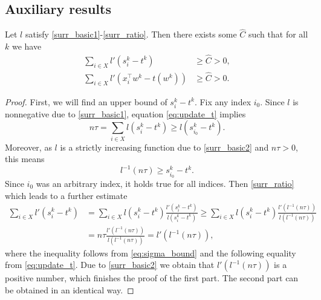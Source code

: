 \subsection{Auxiliary results}\label{app:sgd3}

\begin{lemma}\label{lemma:bound_zero}
  Let $l$ satisfy \ref{surr_basic1}-\ref{surr_ratio}. Then there exists some $\hat C$ such that for all $k$ we have
  \begin{equation*}
    \begin{aligned}
      \sum_{i\in X}l'(s_i^k-t^k) & \ge \hat C > 0, \\
      \sum_{i\in X}l'(x_i^\top w^k-t(w^k)) & \ge \hat C > 0.
    \end{aligned}
  \end{equation*}
\end{lemma}
\begin{proof}
  First, we will find an upper bound of $s_i^k-t^k$. Fix any index $i_0$. Since $l$ is nonnegative due to \ref{surr_basic1}, equation \eqref{eq:update_t} implies
  \begin{equation*}
    n\tau=\sum_{i\in X}l(s_i^k-t^k) \ge l(s_{i_0}^k-t^k).
  \end{equation*}
  Moreover, as $l$ is a strictly increasing function due to \ref{surr_basic2} and $n\tau>0$, this means 
  \begin{equation}\label{eq:sigma_bound}
    l^{-1}(n\tau) \ge s_{i_0}^k-t^k.
  \end{equation}
  Since $i_0$ was an arbitrary index, it holds true for all indices. Then \ref{surr_ratio} which leads to a further estimate
  \begin{equation*}
    \begin{aligned}
    \sum_{i\in X}l'(s_i^k-t^k)
    & = \sum_{i\in X} l(s_i^k-t^k)\frac{l'(s_i^k-t^k)}{l(s_i^k-t^k)}
    \ge \sum_{i\in X} l(s_i^k-t^k)\frac{l'(l^{-1}(n\tau))}{l(l^{-1}(n\tau))} \\
    & = n\tau\frac{l'(l^{-1}(n\tau))}{l(l^{-1}(n\tau))} = l'(l^{-1}(n\tau)),
    \end{aligned}
  \end{equation*}
  where the inequality follows from \eqref{eq:sigma_bound} and the following equality from \eqref{eq:update_t}. Due to \ref{surr_basic2} we obtain that $l'(l^{-1}(n\tau))$ is a positive number, which finishes the proof of the first part. The second part can be obtained in an identical way.
\end{proof}

